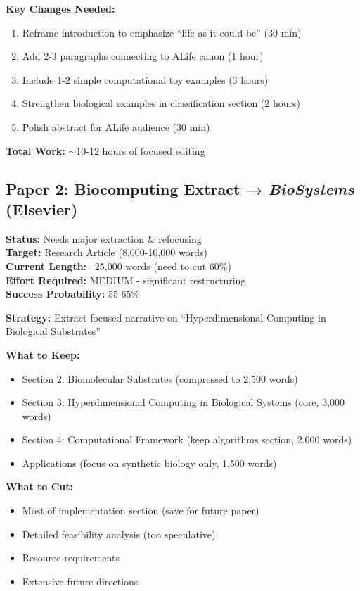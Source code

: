 \documentclass[11pt]{article}
\begin{document}
\textbf{Key Changes Needed:}
\begin{enumerate}[leftmargin=*]
    \item Reframe introduction to emphasize ``life-as-it-could-be'' (30 min)
    \item Add 2-3 paragraphs connecting to ALife canon (1 hour)
    \item Include 1-2 simple computational toy examples (3 hours)
    \item Strengthen biological examples in classification section (2 hours)
    \item Polish abstract for ALife audience (30 min)
\end{enumerate}

\textbf{Total Work:} \textcolor{normal}{$\sim$10-12 hours of focused editing}

\subsection{Paper 2: Biocomputing Extract → \textit{BioSystems} (Elsevier)}

\textbf{Status:} Needs major extraction \& refocusing\\
\textbf{Target:} Research Article (8,000-10,000 words)\\
\textbf{Current Length:} ~25,000 words (need to cut 60\%)\\
\textbf{Effort Required:} \textcolor{important}{MEDIUM - significant restructuring}\\
\textbf{Success Probability:} \textcolor{normal}{55-65\%}

\textbf{Strategy:} Extract focused narrative on ``Hyperdimensional Computing in Biological Substrates''

\textbf{What to Keep:}
\begin{itemize}[leftmargin=*]
    \item Section 2: Biomolecular Substrates (compressed to 2,500 words)
    \item Section 3: Hyperdimensional Computing in Biological Systems (core, 3,000 words)
    \item Section 4: Computational Framework (keep algorithms section, 2,000 words)
    \item Applications (focus on synthetic biology only, 1,500 words)
\end{itemize}

\textbf{What to Cut:}
\begin{itemize}[leftmargin=*]
    \item Most of implementation section (save for future paper)
    \item Detailed feasibility analysis (too speculative)
    \item Resource requirements
    \item Extensive future directions
\end{itemize}
\end{document}
